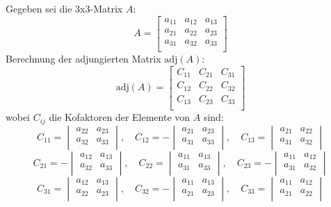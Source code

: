 \documentclass[12pt]{article}
\begin{document}
Gegeben sei die 3x3-Matrix $A$:
\[
A = \begin{bmatrix}
    a_{11} & a_{12} & a_{13} \\
    a_{21} & a_{22} & a_{23} \\
    a_{31} & a_{32} & a_{33} \\
\end{bmatrix}
\]
Berechnung der adjungierten Matrix $\text{adj}(A)$:
\[
\text{adj}(A) = \begin{bmatrix}
    C_{11} & C_{21} & C_{31} \\
    C_{12} & C_{22} & C_{32} \\
    C_{13} & C_{23} & C_{33} \\
\end{bmatrix}
\]
wobei $C_{ij}$ die Kofaktoren der Elemente von $A$ sind:
\[
C_{11} = \begin{vmatrix}
    a_{22} & a_{23} \\
    a_{32} & a_{33} \\
\end{vmatrix}, \quad
C_{12} = -\begin{vmatrix}
    a_{21} & a_{23} \\
    a_{31} & a_{33} \\
\end{vmatrix}, \quad
C_{13} = \begin{vmatrix}
    a_{21} & a_{22} \\
    a_{31} & a_{32} \\
\end{vmatrix}
\]
\[
C_{21} = -\begin{vmatrix}
    a_{12} & a_{13} \\
    a_{32} & a_{33} \\
\end{vmatrix}, \quad
C_{22} = \begin{vmatrix}
    a_{11} & a_{13} \\
    a_{31} & a_{33} \\
\end{vmatrix}, \quad
C_{23} = -\begin{vmatrix}
    a_{11} & a_{12} \\
    a_{31} & a_{32} \\
\end{vmatrix}
\]
\[
C_{31} = \begin{vmatrix}
    a_{12} & a_{13} \\
    a_{22} & a_{23} \\
\end{vmatrix}, \quad
C_{32} = -\begin{vmatrix}
    a_{11} & a_{13} \\
    a_{21} & a_{23} \\
\end{vmatrix}, \quad
C_{33} = \begin{vmatrix}
    a_{11} & a_{12} \\
    a_{21} & a_{22} \\
\end{vmatrix}
\]
\end{document}
